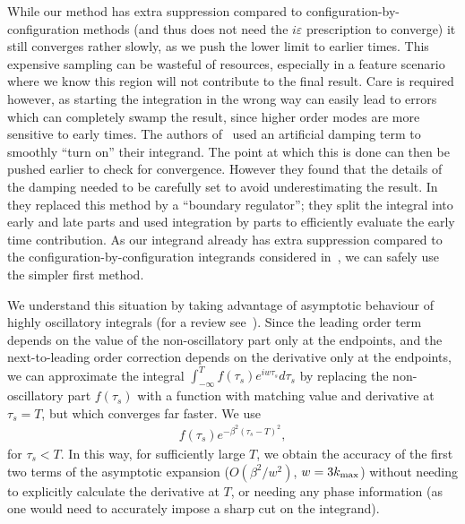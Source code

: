 While our method has extra suppression compared to configuration-by-configuration methods
(and thus does not need the $i\varepsilon$ prescription to converge)
it still converges rather slowly, as we push the lower limit to earlier times.
This expensive sampling can be wasteful of resources,
especially in a feature scenario where we know this
region will not contribute to the final result.
Care is required however, as starting the integration in the wrong way can easily lead to
errors which can completely swamp the result, since higher order modes
are more sensitive to early times.
The authors of~\cite{chen_easther_lim_1} used an artificial damping term to smoothly
``turn on'' their integrand.
The point at which this is done can then be pushed earlier to check for convergence.
However they found that the details of the damping needed to
be carefully set to avoid underestimating the result.
In~\cite{chen_easther_lim_2} they replaced this method by a ``boundary regulator'';
they split the integral into early and late parts and used integration by parts to
efficiently evaluate the early time contribution.
As our integrand already has extra suppression compared to the configuration-by-configuration
integrands considered in~\cite{chen_easther_lim_1,chen_easther_lim_2},
we can safely use the simpler first method.


We understand this situation by
taking advantage of asymptotic behaviour of highly oscillatory
integrals (for a review see~\cite{iserles_2005}).
Since the leading order term depends on
the value of the non-oscillatory part only at the endpoints,
and the next-to-leading order correction depends on the
derivative only at the endpoints, we can approximate the integral
$\int_{-\infty}^T f(\tau_s)e^{iw\tau_s}d\tau_s$
by replacing the non-oscillatory part $f(\tau_s)$ with a function with
matching value and derivative at $\tau_s=T$,
but which converges far faster.
We use
\begin{align}\label{smooth_cutoff}
f(\tau_s)e^{-\beta^2(\tau_s-T)^2},
\end{align}
for $\tau_s<T$.
In this way, for sufficiently large $T$,
we obtain the accuracy of the
first two terms of the asymptotic expansion
($O(\beta^2/w^2)$, $w=3{k_\text{max}}$) without needing to explicitly
calculate the derivative at $T$, or needing any phase information (as
one would need to accurately impose a sharp cut on the integrand).


